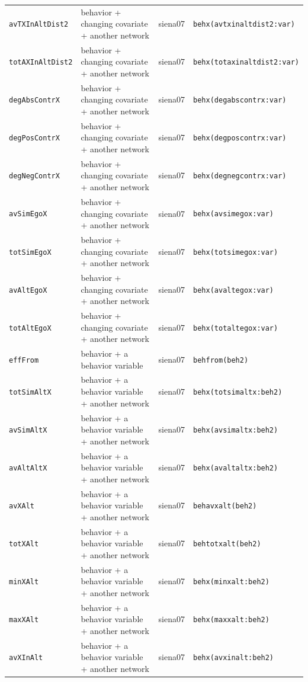 \begin{longtable}{@{}p{2.6cm}p{3.2cm}p{2.9cm}p{5.4cm}@{}}
\texttt{avTXInAltDist2} & behavior + changing covariate + another network & siena07 & \texttt{behx(avtxinaltdist2:var)}\\
\texttt{totAXInAltDist2} & behavior + changing covariate + another network & siena07 & \texttt{behx(totaxinaltdist2:var)}\\
\texttt{degAbsContrX} & behavior + changing covariate + another network & siena07 & \texttt{behx(degabscontrx:var)}\\
\texttt{degPosContrX} & behavior + changing covariate + another network & siena07 & \texttt{behx(degposcontrx:var)}\\
\texttt{degNegContrX} & behavior + changing covariate + another network & siena07 & \texttt{behx(degnegcontrx:var)}\\
\texttt{avSimEgoX} & behavior + changing covariate + another network & siena07 & \texttt{behx(avsimegox:var)}\\
\texttt{totSimEgoX} & behavior + changing covariate + another network & siena07 & \texttt{behx(totsimegox:var)}\\
\texttt{avAltEgoX} & behavior + changing covariate + another network & siena07 & \texttt{behx(avaltegox:var)}\\
\texttt{totAltEgoX} & behavior + changing covariate + another network & siena07 & \texttt{behx(totaltegox:var)}\\
\texttt{effFrom} & behavior + a behavior variable & siena07 & \texttt{behfrom(beh2)}\\
\texttt{totSimAltX} & behavior + a behavior variable + another network & siena07 & \texttt{behx(totsimaltx:beh2)}\\
\texttt{avSimAltX} & behavior + a behavior variable + another network & siena07 & \texttt{behx(avsimaltx:beh2)}\\
\texttt{avAltAltX} & behavior + a behavior variable + another network & siena07 & \texttt{behx(avaltaltx:beh2)}\\
\texttt{avXAlt} & behavior + a behavior variable + another network & siena07 & \texttt{behavxalt(beh2)}\\
\texttt{totXAlt} & behavior + a behavior variable + another network & siena07 & \texttt{behtotxalt(beh2)}\\
\texttt{minXAlt} & behavior + a behavior variable + another network & siena07 & \texttt{behx(minxalt:beh2)}\\
\texttt{maxXAlt} & behavior + a behavior variable + another network & siena07 & \texttt{behx(maxxalt:beh2)}\\
\texttt{avXInAlt} & behavior + a behavior variable + another network & siena07 & \texttt{behx(avxinalt:beh2)}\\

\end{longtable}
